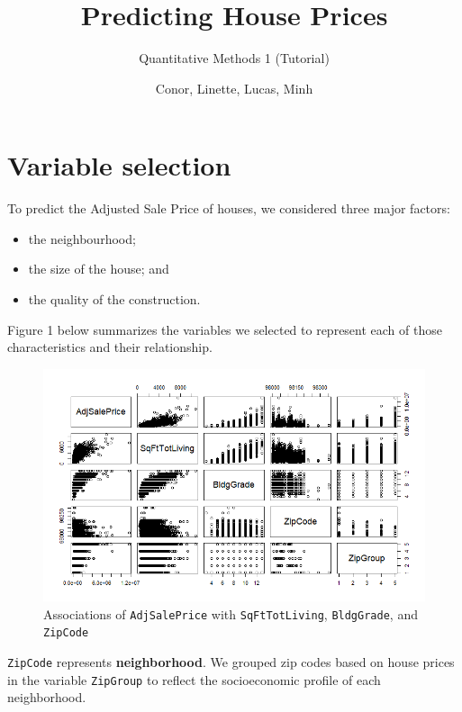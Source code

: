 \documentclass[12pt,a4paper]{article}
\title{Predicting House Prices}
\date{Conor, Linette, Lucas, Minh}
\author{Quantitative Methods 1 (Tutorial)}
\begin{document}
\maketitle

\section{Variable selection}

	\noindent To predict the Adjusted Sale Price of houses, we considered three major factors:
	
	\begin{itemize}
		\item the neighbourhood;
		\item the size of the house; and
		\item the quality of the construction. \\
	\end{itemize}
	
	\noindent Figure 1 below summarizes the variables we selected to represent each of those characteristics and their relationship.
	
	\begin{figure}[H]
		\centering
		\includegraphics[width=1\linewidth]{AdjSalePrice_pairs}
		\caption{Associations of \texttt{AdjSalePrice} with \texttt{SqFtTotLiving}, \texttt{BldgGrade}, and \texttt{ZipCode}}
		\label{fig:adjsalepricepairs}
	\end{figure}
		
	\noindent \texttt{ZipCode} represents \textbf{neighborhood}. We grouped zip codes based on house prices in the variable \texttt{ZipGroup} to reflect the socioeconomic profile of each neighborhood. \\
	
\end{document}
